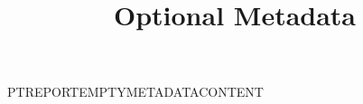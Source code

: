 \documentclass[nominted]{pt-report}
\title{Optional Metadata}
\date{}
\begin{document}
\maketitle
\noindent PTREPORTEMPTYMETADATACONTENT
\end{document}
